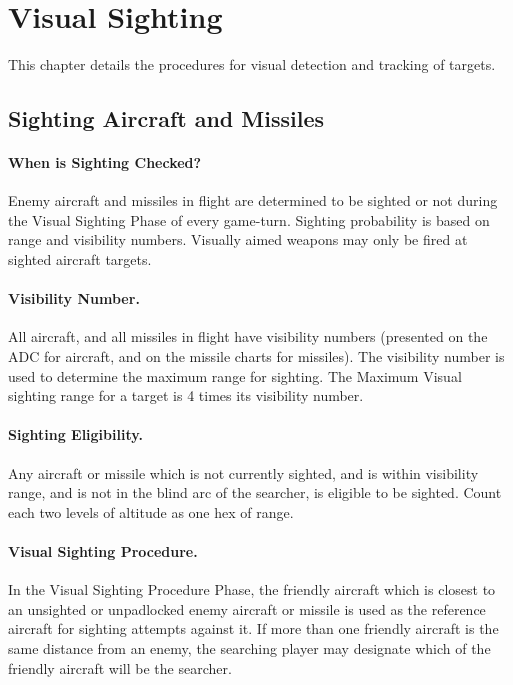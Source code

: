 \section{Visual Sighting}

This chapter details the procedures for visual detection and tracking of targets.

\subsection{Sighting Aircraft and Missiles}

\paragraph{When is Sighting Checked?}  Enemy aircraft and missiles in flight are determined to be sighted or not during the Visual Sighting Phase of every game-turn. Sighting probability is based on range and visibility numbers. Visually aimed weapons may only be fired at sighted aircraft targets.

\paragraph{Visibility Number.} All aircraft, and all missiles in flight have visibility numbers (presented on the ADC for aircraft, and on the missile charts for missiles). The visibility number is used to determine the maximum range for sighting. The Maximum Visual sighting range for a target is 4 times its visibility number.

\paragraph{Sighting Eligibility.} Any aircraft or missile which is not currently sighted, and is within visibility range, and is not in the blind arc of the searcher, is eligible to be sighted. Count each two levels of altitude as one hex of range.

\paragraph{Visual Sighting Procedure.} In the Visual Sighting Procedure Phase, the friendly aircraft which is closest to an unsighted or unpadlocked enemy aircraft or missile is used as the reference aircraft for sighting attempts against it. If more than one friendly aircraft is the same distance from an enemy, the searching player may designate which of the friendly aircraft will be the searcher. 


